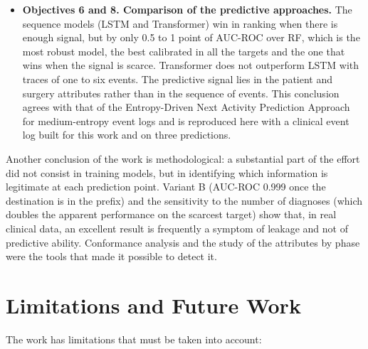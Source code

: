 \begin{itemize}[leftmargin=*]
  \item \textbf{Objectives 6 and 8. Comparison of the predictive approaches.} The sequence models (LSTM and Transformer) win in ranking when there is enough signal, but by only 0.5 to 1 point of AUC-ROC over RF, which is the most robust model, the best calibrated in all the targets and the one that wins when the signal is scarce. Transformer does not outperform LSTM with traces of one to six events. The predictive signal lies in the patient and surgery attributes rather than in the sequence of events. This conclusion agrees with that of the Entropy-Driven Next Activity Prediction Approach \cite{zare2025} for medium-entropy event logs and is reproduced here with a clinical event log built for this work and on three predictions.
\end{itemize}

Another conclusion of the work is methodological: a substantial part of the effort did not consist in training models, but in identifying which information is legitimate at each prediction point. Variant B (AUC-ROC 0.999 once the destination is in the prefix) and the sensitivity to the number of diagnoses (which doubles the apparent performance on the scarcest target) show that, in real clinical data, an excellent result is frequently a symptom of leakage and not of predictive ability. Conformance analysis and the study of the attributes by phase were the tools that made it possible to detect it.

\section{Limitations and Future Work}

The work has limitations that must be taken into account:


